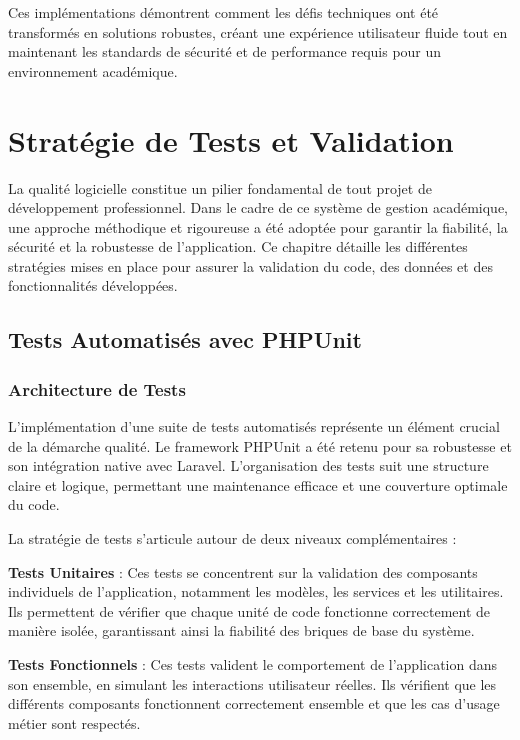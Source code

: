 \documentclass[12pt,a4paper]{report}
\begin{document}
Ces implémentations démontrent comment les défis techniques ont été transformés en solutions robustes, créant une expérience utilisateur fluide tout en maintenant les standards de sécurité et de performance requis pour un environnement académique.


\chapter{Stratégie de Tests et Validation}

La qualité logicielle constitue un pilier fondamental de tout projet de développement professionnel. Dans le cadre de ce système de gestion académique, une approche méthodique et rigoureuse a été adoptée pour garantir la fiabilité, la sécurité et la robustesse de l'application. Ce chapitre détaille les différentes stratégies mises en place pour assurer la validation du code, des données et des fonctionnalités développées.

\section{Tests Automatisés avec PHPUnit}

\subsection{Architecture de Tests}

L'implémentation d'une suite de tests automatisés représente un élément crucial de la démarche qualité. Le framework PHPUnit a été retenu pour sa robustesse et son intégration native avec Laravel. L'organisation des tests suit une structure claire et logique, permettant une maintenance efficace et une couverture optimale du code.

La stratégie de tests s'articule autour de deux niveaux complémentaires :

\textbf{Tests Unitaires} : Ces tests se concentrent sur la validation des composants individuels de l'application, notamment les modèles, les services et les utilitaires. Ils permettent de vérifier que chaque unité de code fonctionne correctement de manière isolée, garantissant ainsi la fiabilité des briques de base du système.

\textbf{Tests Fonctionnels} : Ces tests valident le comportement de l'application dans son ensemble, en simulant les interactions utilisateur réelles. Ils vérifient que les différents composants fonctionnent correctement ensemble et que les cas d'usage métier sont respectés.
\end{document}
